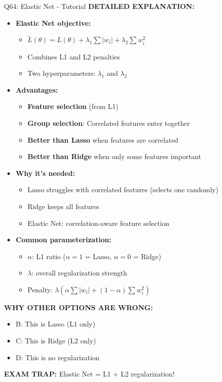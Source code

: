\documentclass[8pt]{beamer}
\begin{document}
\begin{frame}{Q64: Elastic Net - Tutorial}
		\vspace{0.05cm}
		\textbf{DETAILED EXPLANATION:}
		\begin{itemize}
			\item \textbf{Elastic Net objective:}
			\begin{itemize}
				\item $\tilde{L}(\theta) = L(\theta) + \lambda_1 \sum |w_i| + \lambda_2 \sum w_i^2$
				\item Combines L1 and L2 penalties
				\item Two hyperparameters: $\lambda_1$ and $\lambda_2$
			\end{itemize}
			\item \textbf{Advantages:}
			\begin{itemize}
				\item \textbf{Feature selection} (from L1)
				\item \textbf{Group selection}: Correlated features enter together
				\item \textbf{Better than Lasso} when features are correlated
				\item \textbf{Better than Ridge} when only some features important
			\end{itemize}
			\item \textbf{Why it's needed:}
			\begin{itemize}
				\item Lasso struggles with correlated features (selects one randomly)
				\item Ridge keeps all features
				\item Elastic Net: correlation-aware feature selection
			\end{itemize}
			\item \textbf{Common parameterization:}
			\begin{itemize}
				\item $\alpha$: L1 ratio ($\alpha = 1$ = Lasso, $\alpha = 0$ = Ridge)
				\item $\lambda$: overall regularization strength
				\item Penalty: $\lambda(\alpha \sum |w_i| + (1-\alpha)\sum w_i^2)$
			\end{itemize}
		\end{itemize}
		
		\vspace{0.05cm}
		\textcolor{myred}{\textbf{WHY OTHER OPTIONS ARE WRONG:}}
		\begin{itemize}
			\item \textcolor{myred}{B:} This is Lasso (L1 only)
			\item \textcolor{myred}{C:} This is Ridge (L2 only)
			\item \textcolor{myred}{D:} This is no regularization
		\end{itemize}
		
		\textcolor{myred}{\textbf{EXAM TRAP:}} Elastic Net = L1 + L2 regularization!
	\end{frame}
	
\end{document}
